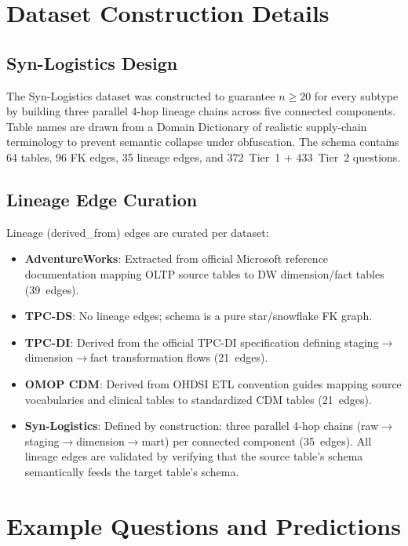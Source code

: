 \FloatBarrier
\section{Dataset Construction Details}
\label{app:datasets}

\subsection{Syn-Logistics Design}
The Syn-Logistics dataset was constructed to guarantee $n\geq20$ for every
subtype by building three parallel 4-hop lineage chains across five
connected components. Table names are drawn from a Domain Dictionary of
realistic supply-chain terminology to prevent semantic collapse under
obfuscation. The schema contains 64 tables, 96 FK edges, 35 lineage edges,
and 372~Tier~1 + 433~Tier~2 questions.

\subsection{Lineage Edge Curation}
Lineage (derived\_from) edges are curated per dataset:
\begin{itemize}[nosep]
\item \textbf{AdventureWorks}: Extracted from official Microsoft reference
documentation mapping OLTP source tables to DW dimension/fact tables (39~edges).
\item \textbf{TPC-DS}: No lineage edges; schema is a pure star/snowflake FK graph.
\item \textbf{TPC-DI}: Derived from the official TPC-DI specification
defining staging$\to$dimension$\to$fact transformation flows (21~edges).
\item \textbf{OMOP CDM}: Derived from OHDSI ETL convention guides mapping
source vocabularies and clinical tables to standardized CDM tables (21~edges).
\item \textbf{Syn-Logistics}: Defined by construction: three parallel
4-hop chains (raw$\to$staging$\to$dimension$\to$mart) per connected
component (35~edges). All lineage edges are validated by verifying that
the source table's schema semantically feeds the target table's schema.
\end{itemize}

\section{Example Questions and Predictions}
\label{app:examples}

